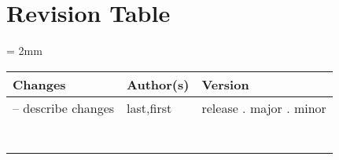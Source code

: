 \documentclass[class=Report, crop=false]{standalone}
\begin{document}
\section*{Revision Table}

\begin{table}[H]
\centering
\scriptsize
\tabulinesep = 2mm
\begin{tabu}{|P{3.5in}|P{1.5in}|P{1in}|} \hline
\textbf{Changes} & \textbf{Author(s)} & \textbf{Version} \\ \hline
[yyyy/mm/dd] -- describe changes & last,first & release . major . minor\\ \hline
 & & \\ \hline
 & & \\ \hline
 & & \\ \hline
 & & \\ \hline
 & & \\ \hline
 & & \\ \hline
 & & \\ \hline
\end{tabu}
\end{table}
\end{document}

